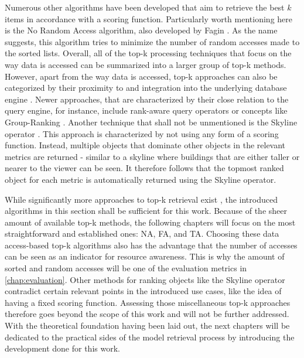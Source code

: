 Numerous other algorithms have been developed that aim to retrieve the best $k$ items in accordance with a scoring function. Particularly worth mentioning here is the No Random Access algorithm, also developed by Fagin \cite{fagin2002a}. As the name suggests, this algorithm tries to minimize the number of random accesses made to the sorted lists. Overall, all of the top-k processing techniques that focus on the way data is accessed can be summarized into a larger group of top-k methods. However, apart from the way data is accessed, top-k approaches can also be categorized by their proximity to and integration into the underlying database engine \cite{ilyas2008}. Newer approaches, that are characterized by their close relation to the query engine, for instance, include rank-aware query operators or concepts like Group-Ranking \cite{li2006}. Another technique that shall not be unmentioned is the Skyline operator \cite{borzsony2001}. This approach is characterized by not using any form of a scoring function. Instead, multiple objects that dominate other objects in the relevant metrics are returned - similar to a skyline where buildings that are either taller or nearer to the viewer can be seen. It therefore follows that the topmost ranked object for each metric is automatically returned using the Skyline operator. 

While significantly more approaches to top-k retrieval exist \cite{ilyas2008}, the introduced algorithms in this section shall be sufficient for this work. Because of the sheer amount of available top-k methods, the following chapters will focus on the most straightforward and established ones: NA, FA, and TA. Choosing these data access-based top-k algorithms also has the advantage that the number of accesses can be seen as an indicator for resource awareness. This is why the amount of sorted and random accesses will be one of the evaluation metrics in \autoref{chap:evaluation}. Other methods for ranking objects like the Skyline operator contradict certain relevant points in the introduced use cases, like the idea of having a fixed scoring function. Assessing those miscellaneous top-k approaches therefore goes beyond the scope of this work and will not be further addressed. With the theoretical foundation having been laid out, the next chapters will be dedicated to the practical sides of the model retrieval process by introducing the development done for this work.
